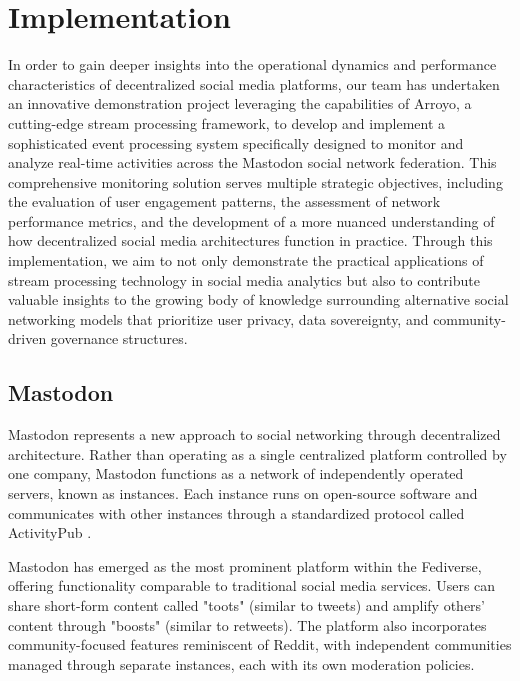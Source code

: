 \section{Implementation}
In order to gain deeper insights into the operational dynamics and performance characteristics of
decentralized social media platforms, our team has undertaken an innovative demonstration project
leveraging the capabilities of Arroyo, a cutting-edge stream processing framework, to develop and
implement a sophisticated event processing system specifically designed to monitor and analyze
real-time activities across the Mastodon social network federation. This comprehensive monitoring
solution serves multiple strategic objectives, including the evaluation of user engagement patterns,
the assessment of network performance metrics, and the development of a more nuanced understanding
of how decentralized social media architectures function in practice. Through this implementation,
we aim to not only demonstrate the practical applications of stream processing technology in social
media analytics but also to contribute valuable insights to the growing body of knowledge
surrounding alternative social networking models that prioritize user privacy, data sovereignty, and
community-driven governance structures.

\subsection{Mastodon}
Mastodon represents a new approach to social networking through decentralized architecture. Rather
than operating as a single centralized platform controlled by one company, Mastodon functions as a
network of independently operated servers, known as instances. Each instance runs on open-source
software and communicates with other instances through a standardized protocol called ActivityPub
\cite{La_Cava_2021,w3c_2018}.

Mastodon has emerged as the most prominent platform within the Fediverse, offering functionality
comparable to traditional social media services. Users can share short-form content called "toots"
(similar to tweets) and amplify others' content through "boosts" (similar to retweets). The platform
also incorporates community-focused features reminiscent of Reddit, with independent communities
managed through separate instances, each with its own moderation policies.

